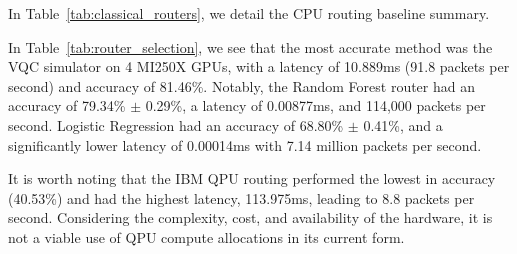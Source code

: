 \documentclass[journal]{IEEEtran}
\begin{document}
In Table~\ref{tab:classical_routers}, we detail the CPU routing baseline summary.

\begin{table}[htbp]
\centering
\caption{Classical CPU Routing Baseline Summary ($N=10$ Seeds, $df=9$).}
\label{tab:classical_routers}
\end{table}

In Table~\ref{tab:router_selection}, we see that the most accurate method was the VQC simulator on 4 MI250X GPUs, with a latency of 10.889ms (91.8 packets per second) and accuracy of 81.46\%. Notably, the Random Forest router had an accuracy of 79.34\% $\pm$ 0.29\%, a latency of 0.00877ms, and 114,000 packets per second. Logistic Regression had an accuracy of 68.80\% $\pm$ 0.41\%, and a significantly lower latency of 0.00014ms with 7.14 million packets per second. 

It is worth noting that the IBM QPU routing performed the lowest in accuracy (40.53\%) and had the highest latency, 113.975ms, leading to 8.8 packets per second. Considering the complexity, cost, and availability of the hardware, it is not a viable use of QPU compute allocations in its current form.

\begin{table}[t]
\centering
\caption{First-Choice Router Selection Accuracy Across Architectures.}
\label{tab:router_selection}
\end{table}
\end{document}
